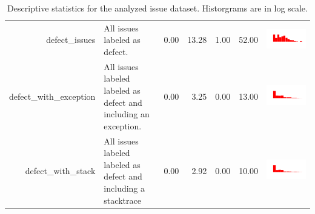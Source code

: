 \begin{table}[ht]
\begin{tabular}{rp{27em}rrrrc}
  defect\_issues & All issues labeled as defect. & 0.00 & 13.28 & 1.00 & 52.00 & \includegraphics[scale = 0.08, clip = true, trim= 50px 70px 50px 60px]{hist-eb1797e86ef23b2a07907e5ccbeff7b9.pdf} \\ 
  defect\_with\_exception & All issues labeled labeled as defect and including an exception. & 0.00 & 3.25 & 0.00 & 13.00 & \includegraphics[scale = 0.08, clip = true, trim= 50px 70px 50px 60px]{hist-f1a879616aa3e0995db35c6c02bc8520.pdf} \\ 
  defect\_with\_stack & All issues labeled labeled as defect and including a stacktrace & 0.00 & 2.92 & 0.00 & 10.00 & \includegraphics[scale = 0.08, clip = true, trim= 50px 70px 50px 60px]{hist-49dbfa02c366cab8b489f33014de587d.pdf} \\
 \hline
 \end{tabular}
\caption{Descriptive statistics for the analyzed issue dataset. Historgrams are in log scale.} 
\label{tab:stacktrace-stats}
\end{table}
